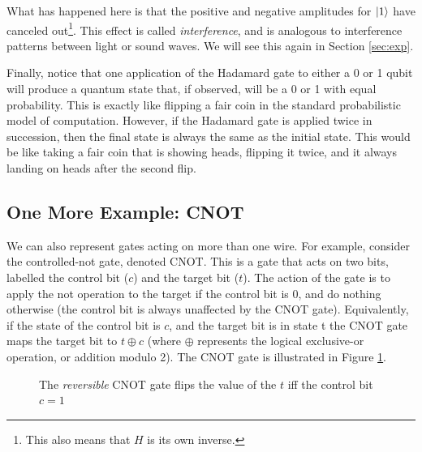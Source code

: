 \documentclass[11pt, oneside]{article}   	%
\begin{document}
\bigskip
\noindent
What has happened here is that the positive and negative amplitudes for $\ket{1}$ have canceled out\footnote{This also means that $H$ is its own inverse.}. This effect is called \emph{interference}, and is analogous to interference patterns between light or sound waves. We will see this again in Section \ref{sec:exp}.

\bigskip
\noindent
Finally, notice that one application of the Hadamard gate to either a 0 or 1 qubit will produce a quantum state that, if observed, will be a 0 or 1 with equal probability. This is exactly like flipping a fair coin in the standard probabilistic model of computation. However, if the Hadamard gate is applied twice in succession, then the final state is always the same as the initial state. This would be like taking a fair coin that is showing heads, flipping it twice, and it always landing on heads after the second flip.

\bigskip
\subsection{One More Example: CNOT}
We can also represent gates acting on more than one wire. For example, consider the controlled-not gate, denoted CNOT. This is a gate that acts on two bits, labelled the control bit ($c$) and the target bit ($t$). The action of the 
gate is to apply the not operation to the target if the control bit is 0, and do nothing otherwise (the control bit is always unaffected by the CNOT gate). Equivalently, if the state of the control bit is $c$, and the target bit is in state t the CNOT gate maps the target bit to $t \oplus c$ (where $\oplus$  represents the logical exclusive-or operation, or addition modulo 2). The CNOT gate is illustrated in Figure  \ref{fig:cnot}.



\begin{figure}[H]
\caption{The \emph{reversible} CNOT gate flips the value of the $t$ iff the control bit $c = 1$ }
\label{fig:cnot}
\end{figure}
\end{document}
